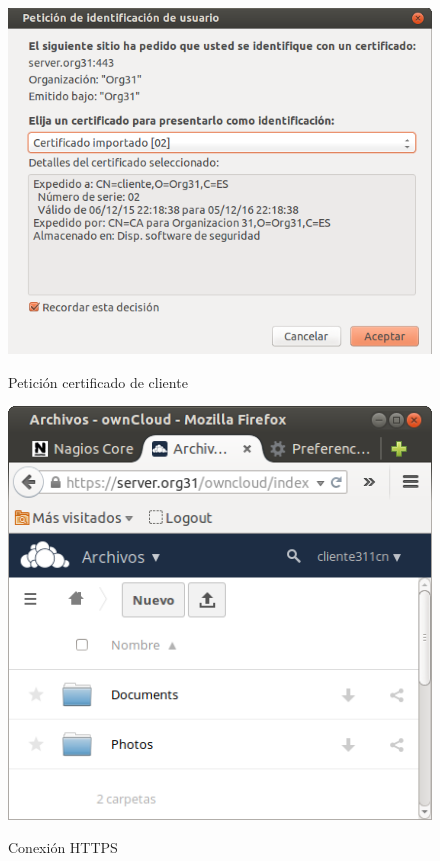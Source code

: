\documentclass[]{article}
\begin{document}
\begin{figure}[h]
	\caption{Petición certificado de cliente}
	\centering
	\includegraphics[scale=0.5]{images/certs/pedircert.png}
	\label{fig:pedircert}
\end{figure}


\begin{figure}[h]
	\caption{Conexión HTTPS}
	\centering
	\includegraphics[scale=0.5]{images/certs/https.png}
	\label{fig:https}
\end{figure}
\end{document}
